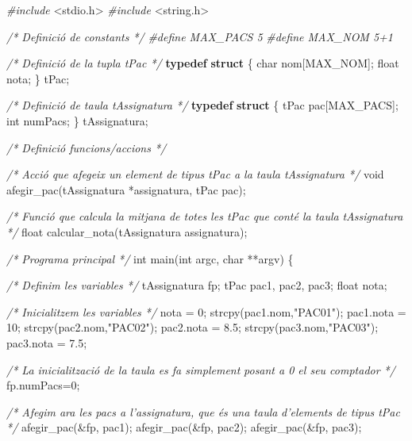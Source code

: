 \documentclass[]{book}
\newenvironment{Shaded}{\begin{snugshade}}{\end{snugshade}}
\newcommand{\KeywordTok}[1]{\textcolor[rgb]{0.13,0.29,0.53}{\textbf{#1}}}
\newcommand{\DataTypeTok}[1]{\textcolor[rgb]{0.13,0.29,0.53}{#1}}
\newcommand{\DecValTok}[1]{\textcolor[rgb]{0.00,0.00,0.81}{#1}}
\newcommand{\FloatTok}[1]{\textcolor[rgb]{0.00,0.00,0.81}{#1}}
\newcommand{\StringTok}[1]{\textcolor[rgb]{0.31,0.60,0.02}{#1}}
\newcommand{\ImportTok}[1]{#1}
\newcommand{\CommentTok}[1]{\textcolor[rgb]{0.56,0.35,0.01}{\textit{#1}}}
\newcommand{\PreprocessorTok}[1]{\textcolor[rgb]{0.56,0.35,0.01}{\textit{#1}}}
\newcommand{\NormalTok}[1]{#1}
\begin{document}
\begin{Shaded}
\begin{Highlighting}[]
\PreprocessorTok{#include }\ImportTok{<stdio.h>}
\PreprocessorTok{#include }\ImportTok{<string.h>}

\CommentTok{/* Definició de constants */}
\PreprocessorTok{#define MAX_PACS 5}
\PreprocessorTok{#define MAX_NOM 5+1}

\CommentTok{/* Definició de la tupla tPac */}
\KeywordTok{typedef} \KeywordTok{struct}\NormalTok{ \{}
    \DataTypeTok{char}\NormalTok{ nom[MAX_NOM];}
    \DataTypeTok{float}\NormalTok{ nota;}
\NormalTok{\} tPac;}

\CommentTok{/* Definició de taula tAssignatura */}
\KeywordTok{typedef} \KeywordTok{struct}\NormalTok{ \{}
\NormalTok{    tPac pac[MAX_PACS];}
    \DataTypeTok{int}\NormalTok{ numPacs;}
\NormalTok{\} tAssignatura;}

\CommentTok{/* Definició funcions/accions */}

\CommentTok{/* Acció que afegeix un element de tipus tPac a la taula tAssignatura */}
\DataTypeTok{void}\NormalTok{ afegir_pac(tAssignatura *assignatura, tPac pac);}

\CommentTok{/* Funció que calcula la mitjana de totes les tPac que conté la taula}
\CommentTok{   tAssignatura */}
\DataTypeTok{float}\NormalTok{ calcular_nota(tAssignatura assignatura);}

\CommentTok{/* Programa principal */}
\DataTypeTok{int}\NormalTok{ main(}\DataTypeTok{int}\NormalTok{ argc, }\DataTypeTok{char}\NormalTok{ **argv) \{}

    \CommentTok{/* Definim les variables */}
\NormalTok{    tAssignatura fp;}
\NormalTok{    tPac pac1, pac2, pac3;}
    \DataTypeTok{float}\NormalTok{ nota;}

    \CommentTok{/* Inicialitzem les variables */}
\NormalTok{    nota = }\DecValTok{0}\NormalTok{;}
\NormalTok{    strcpy(pac1.nom,}\StringTok{"PAC01"}\NormalTok{);}
\NormalTok{    pac1.nota = }\DecValTok{10}\NormalTok{;}
\NormalTok{    strcpy(pac2.nom,}\StringTok{"PAC02"}\NormalTok{);}
\NormalTok{    pac2.nota = }\FloatTok{8.5}\NormalTok{;}
\NormalTok{    strcpy(pac3.nom,}\StringTok{"PAC03"}\NormalTok{);}
\NormalTok{    pac3.nota = }\FloatTok{7.5}\NormalTok{;}

    \CommentTok{/* La inicialització de la taula es fa simplement}
\CommentTok{       posant a 0 el seu comptador */}
\NormalTok{    fp.numPacs=}\DecValTok{0}\NormalTok{;}

    \CommentTok{/* Afegim ara les pacs a l'assignatura, que és una taula}
\CommentTok{       d'elements de tipus tPac */}
\NormalTok{    afegir_pac(&fp, pac1);}
\NormalTok{    afegir_pac(&fp, pac2);}
\NormalTok{    afegir_pac(&fp, pac3);}


\end{Highlighting}
\end{Shaded}
\end{document}
